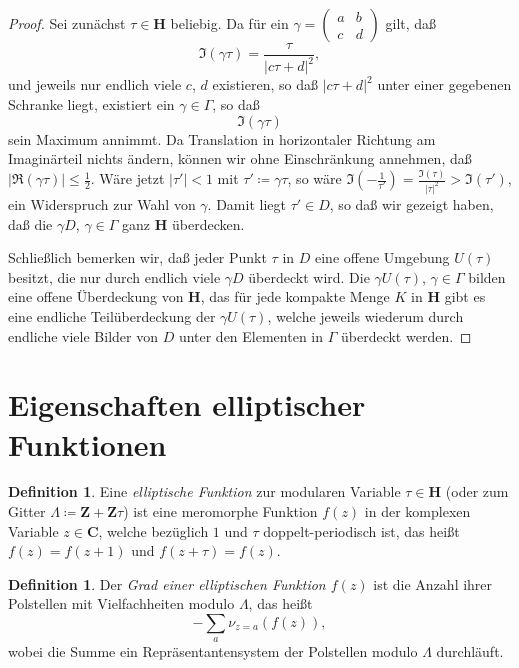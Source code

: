 \documentclass[a4paper,twoside,openright]{report}
\theoremstyle{definition}
\newtheorem{dfn}[thm]{Definition}
\theoremstyle{remark}
\begin{document}
\begin{proof}
  Sei zunächst $\tau \in \mathbf H$ beliebig.
  Da für ein $\gamma = (\begin{smallmatrix} a & b \\ c & d\end{smallmatrix})$ gilt,
  daß
  \[
    \Im(\gamma \tau) = \frac{\tau}{|c \tau + d|^2},
  \]
  und jeweils nur endlich viele $c$, $d$ existieren, so daß $|c \tau + d|^2$ unter
  einer gegebenen Schranke liegt, existiert ein $\gamma \in \Gamma$, so daß
  \[
    \Im(\gamma\tau)
  \]
  sein Maximum annimmt. Da Translation in horizontaler Richtung am Imaginärteil
  nichts ändern, können wir ohne Einschränkung annehmen, daß $|\Re(\gamma\tau)| \leq \frac 1 2$.
  Wäre jetzt $|\tau'| < 1$ mit $\tau' \coloneqq \gamma\tau$, so wäre $\Im(-\frac 1{\tau'}) = \frac{\Im(\tau)}{|\tau|^2} > \Im(\tau')$,
  ein Widerspruch zur Wahl von $\gamma$. Damit liegt $\tau' \in D$, so daß wir
  gezeigt haben, daß die $\gamma D$, $\gamma \in \Gamma$ ganz $\mathbf H$ überdecken.
  
  Schließlich bemerken wir, daß jeder Punkt $\tau$ in $D$ eine offene Umgebung $U(\tau)$ besitzt,   %
  die nur durch endlich viele $\gamma D$ überdeckt wird. Die $\gamma U(\tau)$, $\gamma \in \Gamma$ 
  bilden eine offene Überdeckung von $\mathbf H$, das für jede kompakte Menge
  $K$ in $\mathbf H$ gibt es eine endliche Teilüberdeckung der $\gamma U(\tau)$, welche
  jeweils wiederum durch endliche viele Bilder von $D$ unter den Elementen in $\Gamma$
  überdeckt werden.
\end{proof}

\section{Eigenschaften elliptischer Funktionen}

\begin{dfn}
  Eine \emph{elliptische Funktion} zur modularen Variable $\tau \in \mathbf H$
  (oder zum Gitter $\Lambda \coloneqq \mathbf Z + \mathbf Z \tau$) ist eine
  meromorphe Funktion $f(z)$ in der komplexen Variable $z \in \mathbf C$, welche
  bezüglich $1$ und $\tau$ doppelt-periodisch ist, das heißt
  $f(z) = f(z + 1)$ und $f(z + \tau) = f(z)$.
\end{dfn}

\begin{dfn}
  Der \emph{Grad einer elliptischen Funktion $f(z)$} ist die Anzahl ihrer
  Polstellen mit Vielfachheiten modulo $\Lambda$, das heißt
  \[
    - \sum_{a} \nu_{z = a}(f(z)),
  \]
  wobei die Summe ein Repräsentantensystem der Polstellen modulo $\Lambda$ durchläuft.
\end{dfn}
\end{document}
